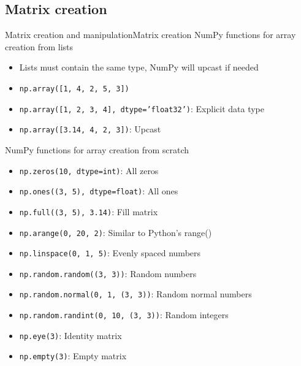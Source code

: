 \documentclass[10pt,compress]{beamer} %
\begin{document}
\subsection{Matrix creation}
\begin{frame}[fragile]{Matrix creation and manipulation}{Matrix creation}
	NumPy functions for array creation from lists
	\begin{itemize}
		\item Lists must contain the same type, NumPy will upcast if needed
		\item \texttt{np.array([1, 4, 2, 5, 3])}
		\item \texttt{np.array([1, 2, 3, 4], dtype='float32')}: Explicit data type
		\item \texttt{np.array([3.14, 4, 2, 3])}: Upcast
	\end{itemize}
	NumPy functions for array creation from scratch
	\begin{itemize}
		\item \texttt{np.zeros(10, dtype=int)}: All zeros
		\item \texttt{np.ones((3, 5), dtype=float)}: All ones
		\item \texttt{np.full((3, 5), 3.14)}: Fill matrix
		\item \texttt{np.arange(0, 20, 2)}: Similar to Python's range()
		\item \texttt{np.linspace(0, 1, 5)}: Evenly spaced numbers
		\item \texttt{np.random.random((3, 3))}: Random numbers
		\item \texttt{np.random.normal(0, 1, (3, 3))}: Random normal numbers
		\item \texttt{np.random.randint(0, 10, (3, 3))}: Random integers
		\item \texttt{np.eye(3)}: Identity matrix
		\item \texttt{np.empty(3)}: Empty matrix
	\end{itemize}
\end{frame}
\end{document}
